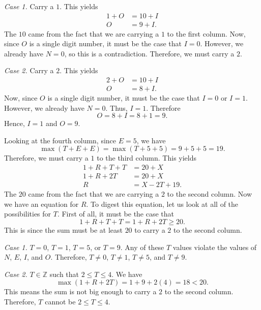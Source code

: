 \documentclass[12pt]{article}
\begin{document}
\noindent\textit{Case 1.} Carry a $1$. This yields
\begin{align*}
    1+O&=10+I\\
    O&=9+I.
\end{align*}
The $10$ came from the fact that we are carrying a $1$ to the first column. Now, since $O$ is a single digit number, it must be the case that $I=0$. However, we already have $N=0$, so this is a contradiction. Therefore, we must carry a $2$.
\vspace{20px}

\noindent\textit{Case 2.} Carry a $2$. This yields
\begin{align*}
    2+O&=10+I\\
    O&=8+I.
\end{align*}
Now, since $O$ is a single digit number, it must be the case that $I=0$ or $I=1$. However, we already have $N=0$. Thus, $I=1$. Therefore
\[O=8+I=8+1=9.\]
Hence, $\boxed{I=1}$ and $\boxed{O=9}$.
\newpage

\noindent Looking at the fourth column, since $E=5$, we have
\[\max(T+E+E)=\max(T+5+5)=9+5+5=19.\]
Therefore, we must carry a $1$ to the third column. This yields
\begin{align*}
    1+R+T+T&=20+X\\
    1+R+2T&=20+X\\
    R&=X-2T+19.
\end{align*}
The $20$ came from the fact that we are carrying a $2$ to the second column. Now we have an equation for $R$. To digest this equation, let us look at all of the possibilities for $T$. First of all, it must be the case that
\[1+R+T+T=1+R+2T\geq 20.\]
This is since the sum must be at least $20$ to carry a $2$ to the second column.
\vspace{20px}

\noindent\textit{Case 1.} $T=0$, $T=1$, $T=5$, or $T=9$. Any of these $T$ values violate the values of $N$, $E$, $I$, and $O$. Therefore, $T\neq 0$, $T\neq 1$, $T\neq 5$, and $T\neq 9$.
\vspace{20px}

\noindent\textit{Case 2.} $T\in\mathbb{Z}$ such that $2\leq T\leq 4$. We have
\[\max(1+R+2T)=1+9+2(4)=18<20.\]
This means the sum is not big enough to carry a $2$ to the second column. Therefore, $T$ cannot be $2\leq T\leq 4$.
\vspace{20px}
\end{document}
